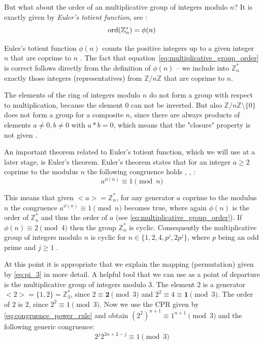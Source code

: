 But what about the order of an multiplicative group of integers modulo $n$? It is exactly given by \textit{Euler's totient function}, see \cite[p.~27]{Ref_Wolfart_2011}:
\begin{equation}
\label{eq:multiplicative_group_order}
\operatorname{ord}(\mathbb{Z}_n^\ast)=\phi(n)
\end{equation}

Euler's totient function $\phi(n)$ counts the positive integers up to a given integer $n$ that are coprime to $n$ \cite[p.~49]{Ref_Forster_2015}. The fact that equation~\ref{eq:multiplicative_group_order} is correct follows directly from the definition of $\phi(n)$ -- we include into $\mathbb{Z}_n^\ast$ exactly those integers (representatives) from $\mathbb{Z}/n\mathbb{Z}$ that are coprime to $n$.

\begin{remark}
The elements of the ring of integers modulo $n$ do not form a group with respect to multiplication, because the element $0$ can not be inverted. But also $\mathbb{Z}/n\mathbb{Z}\setminus\{0\}$ does not form a group for a composite $n$, since there are always products of elements $a\ne0,b\ne0$ with $a*b=0$, which means that the "closure" property is not given \cite{Ref_Schwalen_2014}.
\end{remark}

An important theorem related to Euler's totient function, which we will use at a later stage, is Euler's theorem. Euler's theorem states that for an integer $a\ge2$ coprime to the modulus $n$ the following congruence holds \cite[p.~37]{Ref_Mueller-Stach_2011}, \cite[p.~56]{Ref_Forster_2015}, \cite[p.~104]{Ref_Teschl_2013}:
\begin{equation}
\label{eq:eulers_theorem}
a^{\phi(n)}\equiv1\pmod n
\end{equation}

This means that given $<a>=\mathbb{Z}_n^\ast$, for any generator $a$ coprime to the modulus $n$ the congruence $a^{\phi(n)}\equiv1\pmod n$ becomes true, where again $\phi(n)$ is the order of $\mathbb{Z}_n^\ast$ and thus the order of $a$ (see \ref{eq:multiplicative_group_order}). If $\phi(n)\equiv2\pmod4$ then the group $\mathbb{Z}_n^\ast$ is cyclic. Consequently the multiplicative group of integers modulo $n$ is cyclic for $n\in\{1,2,4,p^j,2p^j\}$, where $p$ being an odd prime and $j\ge1$ \cite{Ref_Schwalen_2014}.

At this point it is appropriate that we explain the mapping (permutation) given by \ref{eq:pi_3} in more detail. A helpful tool that we can use as a point of departure is the multiplicative group of integers modulo $3$. The element $2$ is a generator $<2>=\{1,2\}=\mathbb{Z}_3^\ast$, since $2\equiv\boldsymbol{2}\pmod3$ and $2^2\equiv4\equiv\boldsymbol{1}\pmod3$. The order of $2$ is $2$, since $2^2\equiv1\pmod3$. Now we use the CPR given by \ref{eq:congruence_power_rule} and obtain $(2^2)^{n+1}\equiv1^{n+1}\pmod3$ and the following generic congruence:
\begin{equation}
\label{eq:congruence_k3}
2^j2^{2n+2-j}\equiv1\pmod3
\end{equation}

